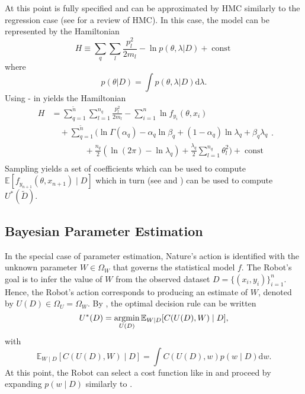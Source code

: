 At this point  is fully specified and can be approximated by HMC similarly to the regression case (see  for a review of HMC). In this case, the model can be represented by the Hamiltonian 
\begin{equation}
	H \equiv  \sum_{q}\sum_{l}\frac{p_{l}^2}{2m_{l}}-\ln p(\theta,\lambda|D)+\operatorname{const}
	\label{ham3}
\end{equation}
where
\begin{equation}
	p(\theta|D) = \int p(\theta,\lambda|D) \mathrm{d} \lambda.
\end{equation}
Using - in  yields the Hamiltonian
\begin{equation}
	\begin{split}
		H&=\sum_{q=1}^{\tilde{n}}\sum_{l=1}^{n_q}\frac{p_{l}^2}{2m_{l}}-\sum_{i=1}^{n}\ln f_{y_i}(\theta,x_i)\\
		&\quad+\sum_{q=1}^{\tilde{n}}\bigg(\ln\Gamma(\alpha_q)-\alpha_q\ln\beta_q+(1-\alpha_q)\ln\lambda_q+\beta_q\lambda_q\\
		&\qquad \qquad+\frac{n_q}{2}(\ln(2\pi)-\ln\lambda_q)+\frac{\lambda_q}{2}\sum_{l=1}^{n_q}\theta_l^2\bigg)+\operatorname{const}\\
	\end{split}.
	\label{ham2}
\end{equation}
Sampling  yields a set of coefficients which can be used to compute $\mathbb{E}[f_{y_{n+1}}(\theta,x_{n+1})\mid D]$ which in turn (see  and ) can be used to compute $U^*(\tilde{D})$.


\subsection{Bayesian Parameter Estimation}
In the special case of parameter estimation, Nature’s action is identified with the unknown parameter $W \in \Omega_W$ that governs the statistical model $f$. The Robot’s goal is to infer the value of $W$ from the observed dataset $D = \{(x_i, y_i)\}_{i=1}^n$. Hence, the Robot’s action corresponds to producing an estimate of $W$, denoted by $U(D) \in \Omega_U = \Omega_W$. By , the optimal decision rule can be written
\begin{equation}
	U^*(D)=\operatorname*{argmin}_{U(D)}\mathbb{E}_{W\mid D}[C(U(D), W)\mid D],
	\label{eq:param_decision}
\end{equation}
with
\begin{equation}
	\mathbb{E}_{W\mid D}[C(U(D), W)\mid D] = \int C(U(D),w)p(w\mid D) \mathrm{d}w.
\end{equation}
At this point, the Robot can select a cost function like in  and proceed by expanding $p(w\mid D)$ similarly to .


